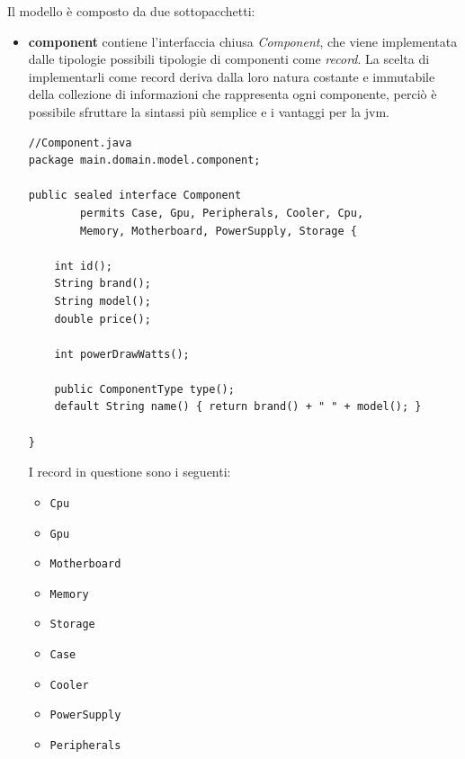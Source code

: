 \documentclass[12pt,a4paper]{article}
\begin{document}
Il modello è composto da due sottopacchetti:
\begin{itemize}
    \item \textbf{component} contiene l'interfaccia chiusa \textit{Component}, che viene implementata dalle tipologie possibili tipologie di componenti come \textit{record}. La scelta di implementarli come record deriva dalla loro natura costante e immutabile della collezione di informazioni che rappresenta ogni componente, perciò è possibile sfruttare la sintassi più semplice e i vantaggi per la jvm.\\

\begin{lstlisting}[style=intellijlight, caption={A simple Java class}, label={lst:hello}]
//Component.java
package main.domain.model.component;

public sealed interface Component
        permits Case, Gpu, Peripherals, Cooler, Cpu, 
        Memory, Motherboard, PowerSupply, Storage {

    int id();
    String brand();
    String model();
    double price();

    int powerDrawWatts();

    public ComponentType type();
    default String name() { return brand() + " " + model(); }

}
\end{lstlisting}
    
    
    I record in questione sono i seguenti:
    \begin{itemize}
        \item \texttt{Cpu}
        \item \texttt{Gpu}
        \item \texttt{Motherboard}
        \item \texttt{Memory}
        \item \texttt{Storage}
        \item \texttt{Case}
        \item \texttt{Cooler}
        \item \texttt{PowerSupply}
        \item \texttt{Peripherals}
    \end{itemize}
    
    
\end{itemize}
\end{document}
